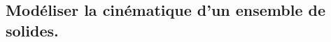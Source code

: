 \documentclass[10pt,fleqn]{book}
\newcommand{\repRel}{../..}
\newcommand{\repStyle}{\repRel/Style}
\newcommand{\td}{fichier_td}
\newcommand{\repExos}{\repRel/ExercicesCompetences}
\newcommand{\repExo}{dossier}
\begin{document}
\begin{multicols}{2}
\renewcommand{\repExo}{\repExos/B2_ProposerModele/B2_12_ModeliserSchemasCinematiques/18_Maxpid}
\renewcommand{\td}{18_Maxpid}
\graphicspath{{\repStyle/png/}{\repExo/images/}}


\renewcommand{\repExo}{\repExos/B2_ProposerModele/B2_12_ModeliserSchemasCinematiques/46_RR_RSG}
\renewcommand{\td}{46_RR_RSG}
\graphicspath{{\repStyle/png/}{\repExo/images/}}


\renewcommand{\repExo}{\repExos/B2_ProposerModele/B2_12_ModeliserSchemasCinematiques/513_Divers_Tabouret}
\renewcommand{\td}{513_Divers_Tabouret}
\graphicspath{{\repStyle/png/}{\repExo/images/}}


\renewcommand{\repExo}{\repExos/B2_ProposerModele/B2_12_ModeliserSchemasCinematiques/514_Divers_Tabouret}
\renewcommand{\td}{514_Divers_Tabouret}
\graphicspath{{\repStyle/png/}{\repExo/images/}}


\end{multicols}

\subsection{Modéliser la cinématique d'un ensemble de solides.} 
\end{document}
